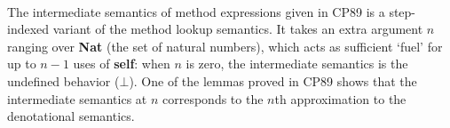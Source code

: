 \begin{AgdaAlign}
\begin{code}
\AgdaSpace{}%
\AgdaSymbol{)}\AgdaSpace{}%
\AgdaSymbol{(}\AgdaSpace{}%
\AgdaSpace{}%
\AgdaSymbol{)}\AgdaSpace{}%
\AgdaSymbol{(}\AgdaSpace{}%
\AgdaSpace{}%
\AgdaSymbol{)}\AgdaSpace{}%
\AgdaSymbol{(}\AgdaSpace{}%
\AgdaSpace{}%
\AgdaSymbol{)}\AgdaSpace{}%
\AgdaSymbol{(}\AgdaSpace{}%
\AgdaSpace{}%
\AgdaSymbol{)}\AgdaSpace{}%
\AgdaSymbol{(}\AgdaSpace{}%
\AgdaSpace{}%
\AgdaSymbol{)}\AgdaSpace{}%
\AgdaSymbol{(}\AgdaSpace{}%
\AgdaSpace{}%
\AgdaSymbol{)}\AgdaSpace{}%
\AgdaSymbol{(}\AgdaSpace{}%
\AgdaSpace{}%
\AgdaSymbol{)}\<%
\\
%
\>[4]\AgdaSymbol{\{\{}\AgdaSpace{}%
\AgdaSpace{}%
\AgdaSymbol{\}\}}\AgdaSpace{}%
\AgdaSymbol{\{\{}\AgdaSpace{}%
\AgdaSpace{}%
\AgdaSymbol{\}\}}\AgdaSpace{}%
\AgdaSymbol{\{\{}\AgdaSpace{}%
\AgdaSpace{}%
\AgdaSymbol{\}\}}\AgdaSpace{}%
\AgdaSymbol{(}\AgdaSpace{}%
\AgdaSpace{}%
\AgdaSymbol{)}\<%
\\
\>[0]\AgdaSpace{}%
\AgdaModule{\AgdaUnderscore{}}\<%
\\
\>[0][@{}l@{\AgdaIndent{0}}]%
\>[4]\AgdaSymbol{(}\AgdaSpace{}%
%
\>[16]\AgdaSymbol{:}\AgdaSpace{}%
\AgdaSpace{}%
\AgdaSpace{}%
\AgdaSpace{}%
\AgdaSymbol{)}%
\>[45]\<%
\\
%
\>[4]\AgdaSymbol{(}\AgdaSpace{}%
%
\>[16]\AgdaSymbol{:}\AgdaSpace{}%
\AgdaSpace{}%
\AgdaSpace{}%
\AgdaSpace{}%
\AgdaSpace{}%
\AgdaSymbol{(}\AgdaSpace{}%
\AgdaSymbol{)}\AgdaSpace{}%
\AgdaSymbol{)}%
\>[45]\<%
\\
\>[0][@{}l@{\AgdaIndent{0}}]%
\>[2]\<%
\\
%
\>[2]\AgdaSpace{}%
\AgdaSpace{}%
\AgdaSymbol{(}\AgdaSpace{}%
\AgdaSpace{}%
\AgdaSymbol{)}\AgdaSpace{}%
\AgdaSymbol{(}\AgdaSpace{}%
\AgdaSpace{}%
\AgdaSymbol{)}\<%
\end{code}
%
The intermediate semantics of method expressions given in CP89
is a step-indexed variant of the method lookup semantics.
It takes an extra argument $n$ ranging over \textbf{Nat} (the set of natural numbers),
which acts as sufficient `fuel' for up to $n-1$ uses of \textbf{self}:
when $n$ is zero, the intermediate semantics is the undefined behavior ($\bot$).
One of the lemmas proved in CP89 shows that the intermediate semantics at $n$
corresponds to the $n$th approximation to the denotational semantics.


\end{AgdaAlign}
